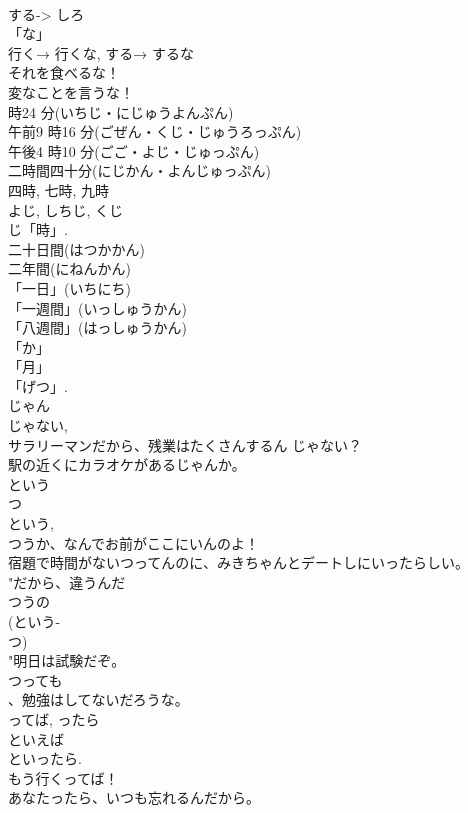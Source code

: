 \documentclass[8pt]{extreport}
\begin{document}
\begin{CJK}{UTF8}{min}
\\	する-> しろ	
\\	「な」 
\\	行く→ 行くな, する→ するな 
\\	それを食べるな！
\\	変なことを言うな！ 
\\	時24 分(いちじ・にじゅうよんぷん)	
\\	午前9 時16 分(ごぜん・くじ・じゅうろっぷん)	
\\	午後4 時10 分(ごご・よじ・じゅっぷん)	
\\	二時間四十分(にじかん・よんじゅっぷん)	
\\	四時, 七時, 九時	
\\	よじ, しちじ, くじ　
\\	じ「時」.	
\\	二十日間(はつかかん)	
\\	二年間(にねんかん)	
\\	「一日」(いちにち)	
\\	「一週間」(いっしゅうかん)	
\\	「八週間」(はっしゅうかん)	
\\	「か」
\\	「⽉」
\\	「げつ」. 
\\	じゃん	
\\	じゃない, 
\\	サラリーマンだから、残業はたくさんするん じゃない？ 
\\	駅の近くにカラオケがあるじゃんか。
\\	という 
\\	つ 
\\	という, 
\\	つうか、なんでお前がここにいんのよ！ 
\\	宿題で時間がないつってんのに、みきちゃんとデートしにいったらしい。 
\\	"だから、違うんだ
\\	つうの
\\	(という-
\\	つ)	
\\	"明日は試験だぞ。
\\	つっても
\\	、勉強はしてないだろうな。
\\	ってば, ったら	
\\	といえば 
\\	といったら.
\\	もう行くってば！
\\	あなたったら、いつも忘れるんだから。 

\end{CJK}
\end{document}
